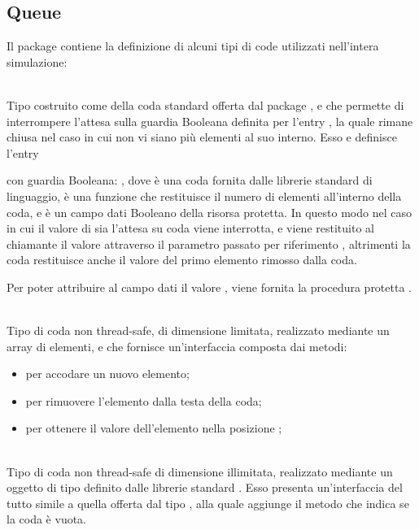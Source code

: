 	\subsection{Queue}
	
	Il package  contiene la definizione di alcuni tipi di code utilizzati nell'intera simulazione:
		\begin{description}
			\item {} \\
			Tipo  costruito come  della coda standard offerta dal package , e che permette di interrompere l'attesa sulla guardia Booleana definita per l'entry , la quale rimane chiusa nel caso in cui non vi siano più elementi al suo interno.
			Esso e definisce l'entry
			\begin{center}
			\end{center}
		
		con guardia Booleana: , dove  è una coda fornita dalle librerie standard di linguaggio,  è una funzione che restituisce il numero di elementi all'interno della coda, e  è un campo dati Booleano della risorsa protetta. In questo modo nel caso in cui il valore di  sia  l'attesa su coda viene interrotta, e viene restituito al chiamante il valore  attraverso il parametro passato per riferimento , altrimenti la coda restituisce anche il valore del primo elemento rimosso dalla coda.
		
		Per poter attribuire al campo dati  il valore , viene fornita la procedura protetta .
			
			\item {} \\
			Tipo di coda non thread-safe, di dimensione limitata, realizzato mediante un array di elementi, e che fornisce un'interfaccia composta dai metodi:
			\begin{itemize}
				\item {} per accodare un nuovo elemento;
				\item {} per rimuovere l'elemento dalla testa della coda;
				\item {} per ottenere il valore dell'elemento nella posizione ;
			\end{itemize}
			
			\item {} \\
			Tipo di coda non thread-safe di dimensione illimitata, realizzato mediante un oggetto di tipo  definito dalle librerie standard . Esso presenta un'interfaccia del tutto simile a quella offerta dal tipo , alla quale aggiunge il metodo  che indica se la coda è vuota. 
			
		\end{description}
	

